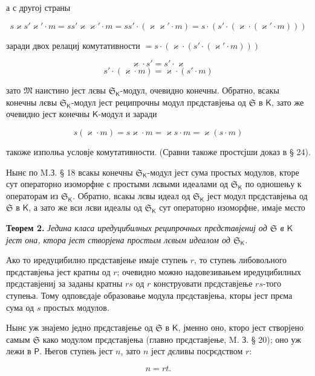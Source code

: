 \documentclass[11pt]{article}
\begin{document}
а с другој страны

\[
s\varkappa  s'\varkappa '\cdot m=ss'\varkappa \varkappa '\cdot m=ss'\cdot(\varkappa \varkappa '\cdot m)
=s\cdot(s'\cdot(\varkappa \cdot(\varkappa '\cdot m)))
\]

заради двох релациј комутативности \(=s\cdot(\varkappa \cdot(s'\cdot(\varkappa '\cdot m)))\)

\[
\varkappa \cdot s'=s'\cdot \varkappa
\]
\[
s'\cdot(\varkappa \cdot m)=\varkappa \cdot(s'\cdot m)
\]

зато \(\mathfrak M\) наистино јест лєвы \(\mathfrak S_{\mathsf K}\)-модул, очевидно конечны. Обратно, всакы конечны лєвы \(\mathfrak S_{\mathsf K}\)-модул јест реципрочны модул прєдставјења од \(\mathfrak S\) в \(\mathsf K\), зато же очевидно јест конечны \(\mathsf K\)-модул и заради

\[
s(\varkappa \cdot m)=s\varkappa \cdot m=\varkappa s\cdot m=\varkappa (s\cdot m)
\]

такоже изполња условје комутативности. (Сравни такоже простєјши доказ в § 24).

Нынє по M.З. § 18 всакы конечны \(\mathfrak S_{\mathsf K}\)-модул јест сума простых модулов, кторе сут операторно изоморфне с простыми лєвыми идеалами од \(\mathfrak S_{\mathsf K}\) по одношењу к операторам из \(\mathfrak S_{\mathsf K}\). Обратно, всакы лєвы идеал од \(\mathfrak S_{\mathsf K}\) јест модул прєдставјења од \(\mathfrak S\) в \(\mathsf K\), а зато же вси лєви идеалы од \(\mathfrak S_{\mathsf K}\) сут операторно изоморфне, имаје мєсто

\textbf{Теорем 2.} \emph{Једина класа иредуцибилных реципрочных прєдставјениј од \(\mathfrak S\) в \(\mathsf K\) јест она, ктора јест створјена простым лєвым идеалом од \(\mathfrak S_{\mathsf K}\).}

Ако то иредуцибилно прєдставјење имаје ступењ \(r\), то ступењ либовољного прєдставјења јест кратны од \(r\); очевидно можно надовезивањем иредуцибилных прєдставјениј за заданы кратны \(rs\) од \(r\) конструовати прєдставјење \(rs\)-того ступења. Тому одповєдаје образовање модула прєдставјења, кторы јест прєма сума од \(s\) простых модулов.

Нынє уж знајемо једно прєдставјење од \(\mathfrak S\) в \(\mathsf K\), јменно оно, кторо јест створјено самым \(\mathfrak S\) како модулом прєдставјења (главно прєдставјење, M. З. § 20); оно уж лежи в \(\mathsf P\). Његов ступењ јест \(n\), зато \(n\) јест дєливы посрєдством \(r\):

\[
n=rt.
\]
\end{document}
